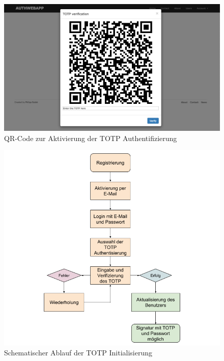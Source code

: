 \documentclass[11pt,a4paper,ngerman]{scrreprt}
\begin{document}
\begin{figure}[htbp]
    \centering
        \includegraphics[width=\textwidth]{Abbildungen/Authwebapp_qr}
    \caption{QR-Code zur Aktivierung der TOTP Authentifizierung}
    \label{fig:Authwebapp_qr}
\end{figure}
\begin{figure}[htbp]
    \centering
        \includegraphics[width=\textwidth]{Abbildungen/Ablauf_TOTP_Initialisierung}
    \caption{Schematischer Ablauf der TOTP Initialisierung}
    \label{fig:totp-init}
\end{figure}
\end{document}
